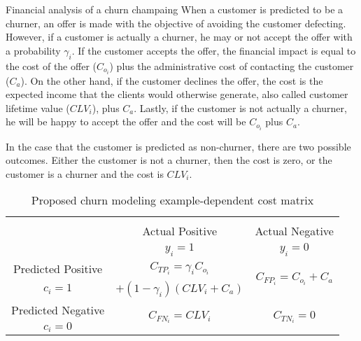 \begin{remark}{Financial analysis of a churn champaing}
When a customer is predicted to be a churner, an offer is made with the objective of avoiding 
the customer defecting. However, if a customer is actually a churner, he may or not accept the 
offer with a probability $\gamma_i$. If the customer accepts the offer, the financial impact is 
equal to the cost of the offer ($C_{o_i}$) plus the administrative cost of contacting the 
customer ($C_a$). On the other hand, if the customer declines the offer, the cost is the 
expected 	income that the clients would otherwise generate, also called customer lifetime value 
($CLV_i$), 	plus $C_a$. Lastly, if the customer is not actually a churner, he will be happy to 
accept the 	offer and the cost will be $C_{o_i}$ plus $C_a$.
	
In the case that the customer is predicted as non-churner, there are two possible outcomes. 
Either the customer is not a churner, then the cost is zero, or the customer is a churner and the 
cost is $CLV_i$. 
\end{remark}

  \begin{table}[t]
	  \centering
	  \footnotesize
     \begin{tabular}{c|c|c}
        \multicolumn{3}{c}{}\\
			\multicolumn{1}{c|}{}  & Actual Positive& Actual Negative \\
			\multicolumn{1}{c|}{} & $y_i=1$& $y_i=0$ \\
			\hline
			Predicted Positive 		& $C_{TP_i}=\gamma_iC_{o_i}$ & 
\multirow{2}{*}{$C_{FP_i}=C_{o_i}+C_a$}\\
			$c_i=1$ & $+(1-\gamma_i)(CLV_i+C_a)$ &\\
			\hline
			Predicted Negative  	& \multirow{ 2}{*}{$C_{FN_i}=CLV_i$} & \multirow{ 
			2}{*}{$C_{TN_i}=0$} \\
			$c_i=0$ & &\\
		\end{tabular}
		\caption{Proposed churn modeling example-dependent cost matrix}
    \label{tab:ch5:1}
  \end{table}

